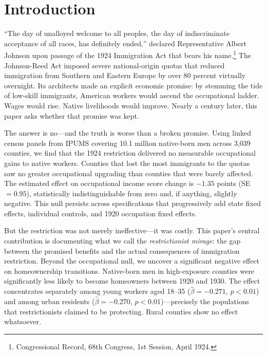 \documentclass[12pt]{article}
\begin{document}
\section{Introduction}

``The day of unalloyed welcome to all peoples, the day of indiscriminate acceptance of all races, has definitely ended,'' declared Representative Albert Johnson upon passage of the 1924 Immigration Act that bears his name.\footnote{Congressional Record, 68th Congress, 1st Session, April 1924.} The Johnson-Reed Act imposed severe national-origin quotas that reduced immigration from Southern and Eastern Europe by over 80 percent virtually overnight. Its architects made an explicit economic promise: by stemming the tide of low-skill immigrants, American workers would ascend the occupational ladder. Wages would rise. Native livelihoods would improve. Nearly a century later, this paper asks whether that promise was kept.

The answer is no---and the truth is worse than a broken promise. Using linked census panels from IPUMS covering 10.1 million native-born men across 3,039 counties, we find that the 1924 restriction delivered no measurable occupational gains to native workers. Counties that lost the most immigrants to the quotas saw no greater occupational upgrading than counties that were barely affected. The estimated effect on occupational income score change is $-1.35$ points (SE $= 0.95$), statistically indistinguishable from zero and, if anything, slightly negative. This null persists across specifications that progressively add state fixed effects, individual controls, and 1920 occupation fixed effects.

But the restriction was not merely ineffective---it was costly. This paper's central contribution is documenting what we call the \textit{restrictionist mirage}: the gap between the promised benefits and the actual consequences of immigration restriction. Beyond the occupational null, we uncover a significant negative effect on homeownership transitions. Native-born men in high-exposure counties were significantly less likely to become homeowners between 1920 and 1930. The effect concentrates separately among young workers aged 18--35 ($\hat{\beta} = -0.271$, $p < 0.01$) and among urban residents ($\hat{\beta} = -0.270$, $p < 0.01$)---precisely the populations that restrictionists claimed to be protecting. Rural counties show no effect whatsoever.
\end{document}
